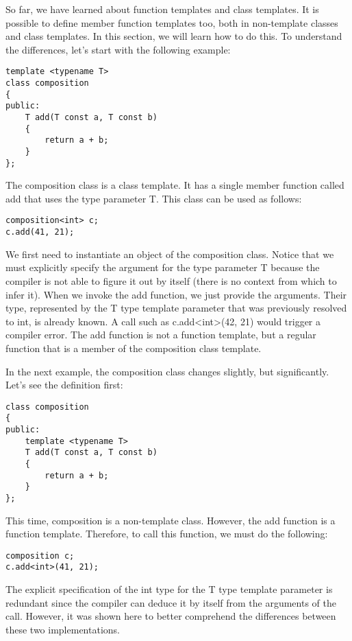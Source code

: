So far, we have learned about function templates and class templates. It is possible to define member function templates too, both in non-template classes and class templates. In this section, we will learn how to do this. To understand the differences, let's start with the following example:

\begin{lstlisting}[style=styleCXX]
template <typename T>
class composition
{
public:
	T add(T const a, T const b)
	{
		return a + b;
	}
};
\end{lstlisting}

The composition class is a class template. It has a single member function called add that uses the type parameter T. This class can be used as follows:

\begin{lstlisting}[style=styleCXX]
composition<int> c;
c.add(41, 21);
\end{lstlisting}

We first need to instantiate an object of the composition class. Notice that we must explicitly specify the argument for the type parameter T because the compiler is not able to figure it out by itself (there is no context from which to infer it). When we invoke the add function, we just provide the arguments. Their type, represented by the T type template parameter that was previously resolved to int, is already known. A call such as c.add<int>(42, 21) would trigger a compiler error. The add function is not a function template, but a regular function that is a member of the composition class template.

In the next example, the composition class changes slightly, but significantly. Let's see the definition first:

\begin{lstlisting}[style=styleCXX]
class composition
{
public:
	template <typename T>
	T add(T const a, T const b)
	{
		return a + b;
	}
};
\end{lstlisting}

This time, composition is a non-template class. However, the add function is a function template. Therefore, to call this function, we must do the following:

\begin{lstlisting}[style=styleCXX]
composition c;
c.add<int>(41, 21);
\end{lstlisting}

The explicit specification of the int type for the T type template parameter is redundant since the compiler can deduce it by itself from the arguments of the call. However, it was shown here to better comprehend the differences between these two implementations.


